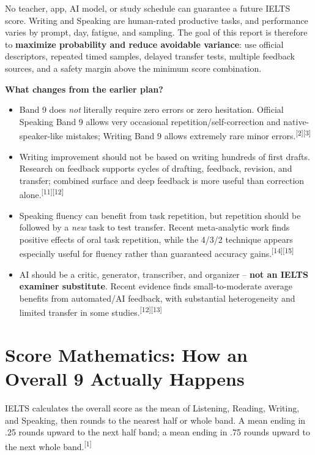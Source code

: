 \documentclass[11pt,a4paper]{article}
\newcommand{\src}[1]{\textsuperscript{[#1]}}
\begin{document}
\begin{warningbox}
No teacher, app, AI model, or study schedule can guarantee a future IELTS score. Writing and Speaking are human-rated productive tasks, and performance varies by prompt, day, fatigue, and sampling. The goal of this report is therefore to \textbf{maximize probability and reduce avoidable variance}: use official descriptors, repeated timed samples, delayed transfer tests, multiple feedback sources, and a safety margin above the minimum score combination.
\end{warningbox}

\textbf{What changes from the earlier plan?}
\begin{itemize}
\item Band 9 does \emph{not} literally require zero errors or zero hesitation. Official Speaking Band 9 allows very occasional repetition/self-correction and native-speaker-like mistakes; Writing Band 9 allows extremely rare minor errors.\src{2}\src{3}
\item Writing improvement should not be based on writing hundreds of first drafts. Research on feedback supports cycles of drafting, feedback, revision, and transfer; combined surface and deep feedback is more useful than correction alone.\src{11}\src{12}
\item Speaking fluency can benefit from task repetition, but repetition should be followed by a \emph{new} task to test transfer. Recent meta-analytic work finds positive effects of oral task repetition, while the 4/3/2 technique appears especially useful for fluency rather than guaranteed accuracy gains.\src{14}\src{15}
\item AI should be a critic, generator, transcriber, and organizer -- \textbf{not an IELTS examiner substitute}. Recent evidence finds small-to-moderate average benefits from automated/AI feedback, with substantial heterogeneity and limited transfer in some studies.\src{12}\src{13}
\end{itemize}

\section{Score Mathematics: How an Overall 9 Actually Happens}

IELTS calculates the overall score as the mean of Listening, Reading, Writing, and Speaking, then rounds to the nearest half or whole band. A mean ending in .25 rounds upward to the next half band; a mean ending in .75 rounds upward to the next whole band.\src{1}
\end{document}
